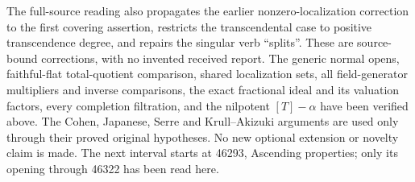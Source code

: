 The full-source reading also propagates the earlier nonzero-localization correction to the first covering assertion, restricts the transcendental case to positive transcendence degree, and repairs the singular verb ``splits''. These are source-bound corrections, with no invented received report. The generic normal opens, faithful-flat total-quotient comparison, shared localization sets, all field-generator multipliers and inverse comparisons, the exact fractional ideal and its valuation factors, every completion filtration, and the nilpotent \([T]-\alpha\) have been verified above. The Cohen, Japanese, Serre and Krull--Akizuki arguments are used only through their proved original hypotheses. No new optional extension or novelty claim is made. The next interval starts at 46293, Ascending properties; only its opening through 46322 has been read here.
